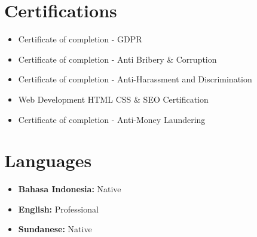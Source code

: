 \documentclass[a4paper, 11pt]{article}
\newcommand{\resumeItem}[1]{
  \item\small{
    {#1 \vspace{-2pt}}
  }
}
\newcommand{\resumeItemListStart}{\begin{itemize}[leftmargin=0.22in]}
\newcommand{\resumeItemListEnd}{\end{itemize}\vspace{-20pt}}
\begin{document}
\section{Certifications}
    \resumeItemListStart
        \resumeItem{Certificate of completion - GDPR}
        \resumeItem{Certificate of completion - Anti Bribery \& Corruption}
        \resumeItem{Certificate of completion - Anti-Harassment and Discrimination}
        \resumeItem{Web Development HTML CSS \& SEO Certification}
        \resumeItem{Certificate of completion - Anti-Money Laundering}
    \resumeItemListEnd

\section{Languages}
    \resumeItemListStart
        \resumeItem{\textbf{Bahasa Indonesia:} Native}
        \resumeItem{\textbf{English:} Professional}
        \resumeItem{\textbf{Sundanese:} Native}
    \resumeItemListEnd
\end{document}
